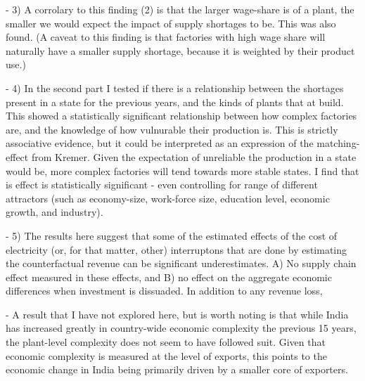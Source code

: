 \documentclass[11pt]{article}
\begin{document}
- 3) A corrolary to this finding (2) is that the larger wage-share is of a plant, the smaller we would expect the impact of supply shortages to be. This was also found. (A caveat to this finding is that factories with high wage share will naturally have a smaller supply shortage, because it is weighted by their product use.)

- 4) In the second part I tested if there is a relationship between the shortages present in a state for the previous years, and the kinds of plants that at build. This showed a statistically significant relationship between how complex factories are, and the knowledge of how vulnurable their production is. This is strictly associative evidence, but it could be interpreted as an expression of the matching-effect from Kremer. Given the expectation of unreliable the production in a state would be, more complex factories will tend towards more stable states. I find that is effect is statistically significant - even controlling for range of different attractors (such as economy-size, work-force size, education level, economic growth, and industry).

- 5) The results here suggest that some of the estimated effects of the cost of electricity (or, for that matter, other) interruptons that are done by estimating the counterfactual revenue can be significant underestimates. A) No supply chain effect measured in these effects, and B) no effect on the aggregate economic differences when investment is dissuaded. In addition to any revenue loss, 

- A result that I have not explored here, but is worth noting is that while India has increased greatly in country-wide economic complexity the previous 15 years, the plant-level complexity does not seem to have followed suit. Given that economic complexity is measured at the level of exports, this points to the economic change in India being primarily driven by a smaller core of exporters.


\newpage


\end{document}
